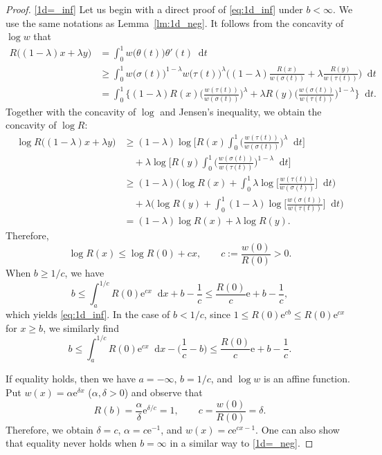 \documentclass[sts]{imsart}
\theoremstyle{definition}
\theoremstyle{remark}
\newcommand{\e}{\mathrm{e}}
\newcommand*\diff{\mathop{}\!\mathrm{d}}
\begin{document}
\begin{proof}
\eqref{1d=_inf}
Let us begin with a direct proof of \eqref{eq:1d_inf} under $b<\infty$.
We use the same notations as Lemma~\ref{lm:1d_neg}.
It follows from the concavity of $\log w$ that
\begin{align*}
R\bigl( (1-\lambda)x +\lambda y \bigr)
&= \int_0^1 w\bigl( \theta(t) \bigr) \theta'(t) \diff t \\
&\ge \int_0^1 w\bigl( \sigma(t) \bigr)^{1-\lambda} w\bigl( \tau(t) \bigr)^{\lambda}
 \biggl( (1-\lambda) \frac{R(x)}{w(\sigma(t))} +\lambda \frac{R(y)}{w(\tau(t))} \biggr) \diff t \\
&= \int_0^1 \biggl\{ (1-\lambda) R(x) \biggl( \frac{w(\tau(t))}{w(\sigma(t))} \biggr)^{\lambda}
 +\lambda R(y) \biggl( \frac{w(\sigma(t))}{w(\tau(t))} \biggr)^{1-\lambda} \biggr\} \diff t.
\end{align*}
Together with the concavity of $\log$ and Jensen's inequality, we obtain the concavity of $\log R$:
\begin{align*}
\log R\bigl( (1-\lambda)x +\lambda y \bigr)
&\ge (1-\lambda) \log\biggl[ R(x) \int_0^1 \biggl( \frac{w(\tau(t))}{w(\sigma(t))} \biggr)^{\lambda} \diff t \biggr] \\
&\quad +\lambda \log\biggl[ R(y) \int_0^1 \biggl( \frac{w(\sigma(t))}{w(\tau(t))} \biggr)^{1-\lambda} \diff t \biggr] \\
&\ge (1-\lambda) \biggl( \log R(x) +\int_0^1 \lambda \log\biggl[ \frac{w(\tau(t))}{w(\sigma(t))} \biggr] \diff t \biggr) \\
&\quad +\lambda \biggl( \log R(y) +\int_0^1 (1-\lambda) \log\biggl[ \frac{w(\sigma(t))}{w(\tau(t))} \biggr] \diff t \biggr) \\
&= (1-\lambda) \log R(x) +\lambda \log R(y).
\end{align*}
Therefore,
\[ \log R(x) \le \log R(0) +cx, \qquad c:=\frac{w(0)}{R(0)}>0. \]
When $b \ge 1/c$, we have
\[
b \le \int_a^{1/c} R(0) \e^{cx} \diff x +b-\frac{1}{c}
 \le \frac{R(0)}{c} \e +b-\frac{1}{c},
\]
which yields \eqref{eq:1d_inf}.
In the case of $b<1/c$, since $1 \le R(0) \e^{cb} \le R(0) \e^{cx}$ for $x \ge b$,
we similarly find
\[
b \le \int_a^{1/c} R(0) \e^{cx} \diff x -\biggl( \frac{1}{c}-b \biggr)
 \le \frac{R(0)}{c} \e +b-\frac{1}{c}.
\]

If equality holds, then we have $a=-\infty$, $b=1/c$, and $\log w$ is an affine function.
Put $w(x) =\alpha \e^{\delta x}$ ($\alpha,\delta>0$) and observe that
\[ R(b) =\frac{\alpha}{\delta}\e^{\delta/c} =1, \qquad
 c =\frac{w(0)}{R(0)} =\delta. \]
Therefore, we obtain $\delta=c$, $\alpha=c\e^{-1}$, and $w(x)=c\e^{cx-1}$.
One can also show that equality never holds when $b=\infty$ in a similar way to \eqref{1d=_neg}.
\end{proof}
\end{document}
